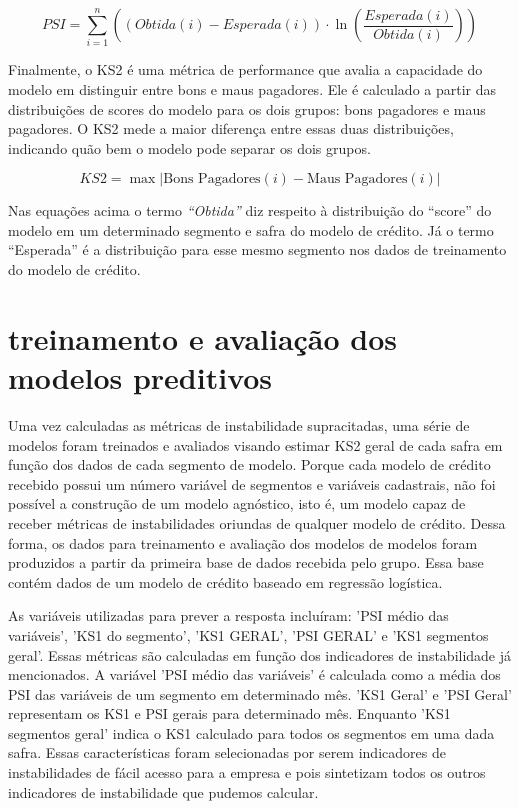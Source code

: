 \begin{equation}
PSI = \sum_{i=1}^{n} \left( (Obtida(i) - Esperada(i) ) \cdot \ln\left(\frac{{Esperada(i)}}{{Obtida(i)}}\right) \right)
\end{equation}

Finalmente, o KS2 é uma métrica de performance que avalia a capacidade do modelo em distinguir entre bons e maus pagadores. Ele é calculado a partir das distribuições de scores do modelo para os dois grupos: bons pagadores e maus pagadores. O KS2 mede a maior diferença entre essas duas distribuições, indicando quão bem o modelo pode separar os dois grupos. 

\begin{equation}
    KS2 = \max {\left| \text{Bons Pagadores}(i) - \text{Maus Pagadores}(i) \right| }
\end{equation}

Nas equações acima o termo \emph{“Obtida”} diz respeito à distribuição do “score” do modelo em um determinado segmento e safra do modelo de crédito. Já o termo “Esperada” é a distribuição para esse mesmo segmento nos dados de treinamento do modelo de crédito.

\section{treinamento e avaliação dos modelos preditivos}

Uma vez calculadas as métricas de instabilidade supracitadas, uma série de modelos foram treinados e avaliados visando estimar KS2 geral de cada safra em função dos dados de cada segmento de modelo.
	Porque cada modelo de crédito recebido possui um número variável de segmentos e variáveis cadastrais, não foi possível a construção de um modelo agnóstico, isto é, um modelo capaz de receber métricas de instabilidades oriundas de qualquer modelo de crédito. Dessa forma, os dados para treinamento e avaliação dos modelos de modelos foram produzidos a partir da primeira base de dados recebida pelo grupo. Essa base contém dados de um modelo de crédito baseado em regressão logística.	
	
	As variáveis utilizadas para prever a resposta incluíram: 'PSI médio das variáveis', 'KS1 do segmento', 'KS1 GERAL', 'PSI GERAL' e 'KS1 segmentos geral'. Essas métricas são calculadas em função dos indicadores de instabilidade já mencionados. A variável 'PSI médio das variáveis' é calculada como a média dos PSI das variáveis de um segmento em determinado mês. 'KS1 Geral' e 'PSI Geral' representam os KS1 e PSI gerais para determinado mês. Enquanto 'KS1 segmentos geral' indica o KS1 calculado para todos os segmentos em uma dada safra. Essas características foram selecionadas por serem indicadores de instabilidades de fácil acesso para a empresa e pois sintetizam todos os outros indicadores de instabilidade que pudemos calcular.

